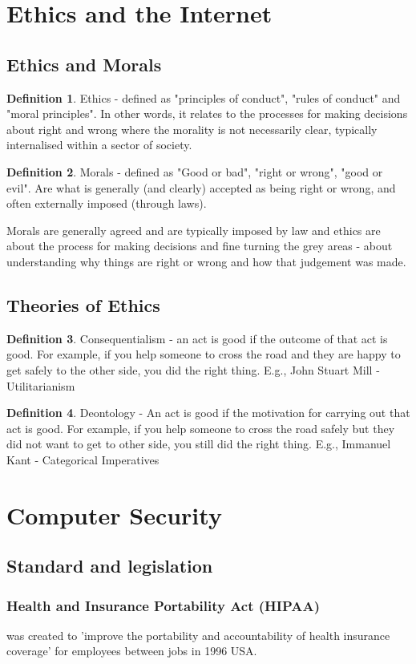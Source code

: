\documentclass[a4paper]{article}
\theoremstyle{plain}
\theoremstyle{definition}
\newtheorem{defn}{Definition}[section]
\theoremstyle{remark}
\begin{document}
\section{Ethics and the Internet}
\subsection{Ethics and Morals}
\begin{defn}
	Ethics - defined as "principles of conduct", "rules of conduct" and "moral principles". In other words, it relates to the processes for making decisions about right and wrong where the morality is not necessarily clear, typically internalised within a sector of society.
\end{defn}
\begin{defn}
	Morals - defined as "Good or bad", "right or wrong", "good or evil". Are what is generally (and clearly) accepted as being right or wrong, and often externally imposed (through laws).
\end{defn}
Morals are generally agreed and are typically imposed by law and ethics are about the process for making decisions and fine turning the grey areas - about understanding why things are right or wrong and how that judgement was made.
\subsection{Theories of Ethics}
\begin{defn}
	Consequentialism - an act is good if the outcome of that act is good. For example, if you help someone to cross the road and they are happy to get safely to the other side, you did the right thing. E.g., John Stuart Mill - Utilitarianism 
\end{defn}
\begin{defn}
	Deontology - An act is good if the motivation for carrying out that act is good. For example, if you help someone to cross the road safely but they did not want to get to other side, you still did the right thing. E.g., Immanuel Kant - Categorical Imperatives
\end{defn}
\section{Computer Security}
\subsection{Standard and legislation}
\subsubsection{Health and Insurance Portability Act (HIPAA)}
was created to 'improve the portability and accountability of health insurance coverage' for employees between jobs in 1996 USA.
\end{document}
